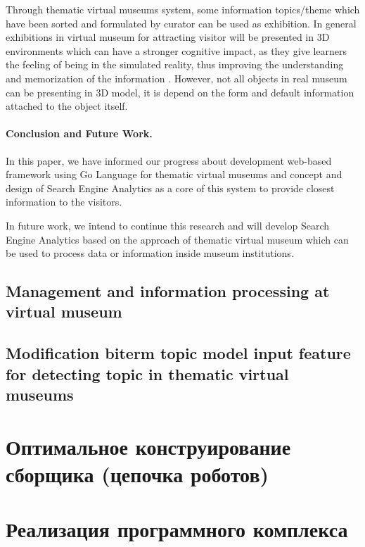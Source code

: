 Through thematic virtual museums system, some information topics/theme which have been sorted and formulated by curator can be used as exhibition. In general exhibitions in virtual museum for attracting visitor will be presented in 3D environments which can have a stronger cognitive impact, as they give learners the feeling of being in the simulated reality, thus improving the understanding and memorization of the information \cite{GheorghiuStefan}. However, not all objects in real museum can be presenting in 3D model, it is depend on the form and default information attached to the object itself.

\paragraph{Conclusion and Future Work.} In this paper, we have informed our progress about development web-based framework using Go Language for thematic virtual museums and concept and design of Search Engine Analytics as a core of this system to provide closest information to the visitors.

In future work, we intend to continue this research and will develop Search Engine Analytics based on the approach of thematic virtual museum which can be used to process data or information inside museum institutions.

\subsection{Management and information processing at virtual museum}\label{subsec:ch4/sec2/sub4}

\subsection{Modification biterm topic model input feature for detecting topic in thematic virtual museums}\label{subsec:ch4/sec2/sub5}

\section{Оптимальное конструирование сборщика (цепочка роботов)}\label{sec:ch4/sect3}

\section{Реализация программного комплекса}\label{sec:ch4/sect4}

\FloatBarrier

